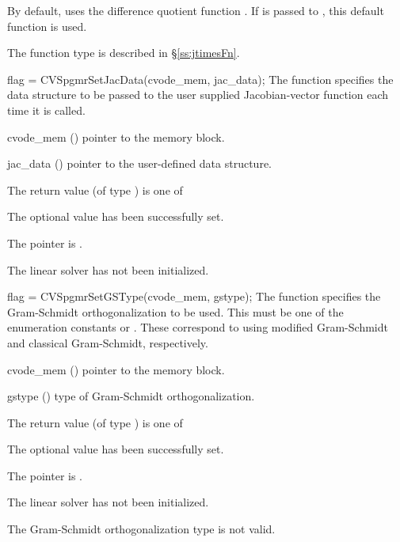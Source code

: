 {
  By default, {\cvspgmr} uses the difference quotient function .
  If  is passed to , this default function is used.

  The function type  is described in \S\ref{ss:jtimesFn}.
}
{
  flag = CVSpgmrSetJacData(cvode\_mem, jac\_data);
}
{
  The function  specifies the data structure
  to be passed to the user supplied Jacobian-vector
  function each time it is called.
}
{
  \begin{args}
  \item[cvode\_mem] ()
    pointer to the {\cvode} memory block.
  \item[jac\_data] ()
     pointer to the user-defined data structure.
  \end{args}
}
{
  The return value  (of type ) is one of
  \begin{args}
  \item[\Id{CVSPGMR\_SUCCESS}] 
    The optional value has been successfully set.
  \item[\Id{CVSPGMR\_MEM\_NULL}]
    The  pointer is .
  \item[\Id{CVSPGMR\_LMEM\_NULL}]
    The {\cvspgmr} linear solver has not been initialized.
  \end{args}
}
{}
{
  flag = CVSpgmrSetGSType(cvode\_mem, gstype);
}
{
  The function  specifies the 
  Gram-Schmidt orthogonalization to be used. 
  This must be one of the enumeration constants 
  or . These correspond to using modified Gram-Schmidt 
  and classical Gram-Schmidt, respectively. 
}
{
  \begin{args}
  \item[cvode\_mem] ()
    pointer to the {\cvode} memory block.
  \item[gstype] ()
    type of Gram-Schmidt orthogonalization.
  \end{args}
}
{
  The return value  (of type ) is one of
  \begin{args}
  \item[\Id{CVSPGMR\_SUCCESS}] 
    The optional value has been successfully set.
  \item[\Id{CVSPGMR\_MEM\_NULL}]
    The  pointer is .
  \item[\Id{CVSPGMR\_LMEM\_NULL}]
    The {\cvspgmr} linear solver has not been initialized.
  \item[\Id{CVSPGMR\_ILL\_INPUT}]
    The Gram-Schmidt orthogonalization type  is not valid.
  \end{args}
}
